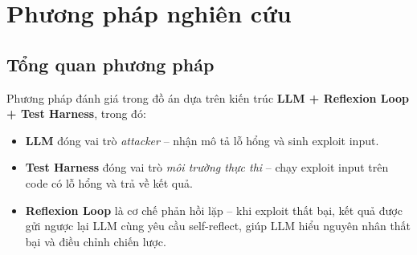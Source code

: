 \documentclass{nt521report}
\begin{document}
\chapter{Phương pháp nghiên cứu}
\label{chap:method}

\section{Tổng quan phương pháp}
\label{sec:method-overview}

Phương pháp đánh giá trong đồ án dựa trên kiến trúc \textbf{LLM + Reflexion Loop + Test Harness}, trong đó:
\begin{itemize}
  \item \textbf{LLM} đóng vai trò \textit{attacker} -- nhận mô tả lỗ hổng và sinh exploit input.
  \item \textbf{Test Harness} đóng vai trò \textit{môi trường thực thi} -- chạy exploit input trên code có lỗ hổng và trả về kết quả.
  \item \textbf{Reflexion Loop} là cơ chế phản hồi lặp -- khi exploit thất bại, kết quả được gửi ngược lại LLM cùng yêu cầu self-reflect, giúp LLM hiểu nguyên nhân thất bại và điều chỉnh chiến lược.
\end{itemize}
\end{document}
